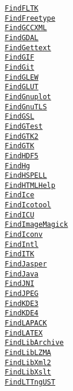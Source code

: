\documentclass{article}
\newcommand{\cmakemodule}[1]{{\href{https://cmake.org/cmake/help/v3.13/module/#1.html}{{\lstinline{#1}}}}}
\begin{document}
\begin{minipage}[t]{0.18\linewidth}
\cmakemodule{FindFLTK}\\
\cmakemodule{FindFreetype}\\
\cmakemodule{FindGCCXML}\\
\cmakemodule{FindGDAL}\\
\cmakemodule{FindGettext}\\
\cmakemodule{FindGIF}\\
\cmakemodule{FindGit}\\
\cmakemodule{FindGLEW}\\
\cmakemodule{FindGLUT}\\
\cmakemodule{FindGnuplot}\\
\cmakemodule{FindGnuTLS}\\
\cmakemodule{FindGSL}\\
\cmakemodule{FindGTest}\\
\cmakemodule{FindGTK2}\\
\cmakemodule{FindGTK}\\
\cmakemodule{FindHDF5}\\
\cmakemodule{FindHg}\\
\cmakemodule{FindHSPELL}\\
\cmakemodule{FindHTMLHelp}\\
\cmakemodule{FindIce}\\
\cmakemodule{FindIcotool}\\
\cmakemodule{FindICU}\\
\cmakemodule{FindImageMagick}\\
\cmakemodule{FindIconv}\\
\cmakemodule{FindIntl}\\
\cmakemodule{FindITK}\\
\cmakemodule{FindJasper}\\
\cmakemodule{FindJava}\\
\cmakemodule{FindJNI}\\
\cmakemodule{FindJPEG}\\
\cmakemodule{FindKDE3}\\
\cmakemodule{FindKDE4}\\
\cmakemodule{FindLAPACK}\\
\cmakemodule{FindLATEX}\\
\cmakemodule{FindLibArchive}\\
\cmakemodule{FindLibLZMA}\\
\cmakemodule{FindLibXml2}\\
\cmakemodule{FindLibXslt}\\
\cmakemodule{FindLTTngUST}\\

\end{minipage}
\end{document}
